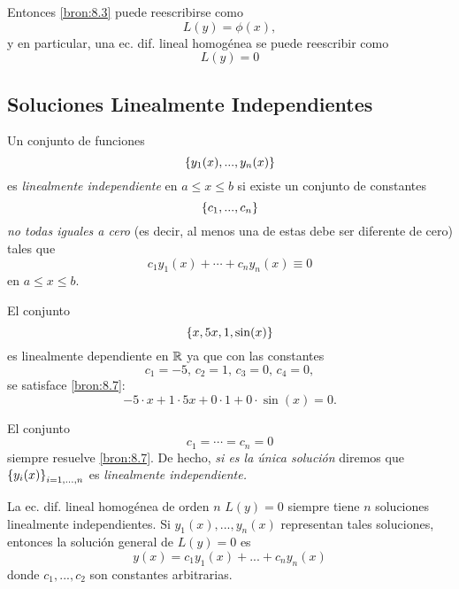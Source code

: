 	Entonces \eqref{bron:8.3} puede reescribirse como
	\begin{equation}
		\label{bron:8.5}
		L(y)=\phi(x),
	\end{equation}
	y en particular, una ec. dif. lineal homog\'enea se puede reescribir como
	\begin{equation}
		\label{bron:8.6}
		L(y)=0
	\end{equation}
	


\subsection{Soluciones Linealmente Independientes}


	Un conjunto de funciones
	$$
	\left\{ y_{1}(x),...,y_{n}(x) \right\}
	$$
	es \emph{linealmente independiente} en $a\leq x \leq b$ si existe un conjunto de constantes
	$$
	\left\{ c_{1}, ..., c_{n} \right\}
	$$ \emph{no todas iguales a cero} (es decir, al menos una de estas debe ser diferente de cero) tales que
	\begin{equation}
		\label{bron:8.7}
		c_{1}y_{1}(x)+\cdots+c_{n}y_{n}(x)\equiv 0
	\end{equation}
	en $a\leq x \leq b.$



	\begin{problema}
		El conjunto
		$$
		\left\{ x, 5x, 1, \sin(x) \right\}
		$$es linealmente dependiente en $\mathbb{R}$ ya que con las constantes
		$$c_{1}=-5, \, c_{2}=1, \, c_{3}=0, \, c_{4}=0,$$ se satisface \eqref{bron:8.7}:
		$$
		-5\cdot x+1\cdot 5x+0\cdot 1+0\cdot \sin(x)=0.
		$$
	\end{problema}
	



	\begin{rem}
		El conjunto $$c_{1}=\cdots =c_{n}=0$$ siempre resuelve \eqref{bron:8.7}. De hecho, \emph{si es la única soluci\'on}  diremos que $\left\{ y_{i}(x) \right\}_{i=1,...,n}$ es \emph{linealmente independiente.}
	\end{rem}
	



	La ec. dif. lineal homog\'enea de orden $n$ $L(y)=0$ siempre tiene $n$ soluciones linealmente independientes. Si $y_{1}(x),...,y_{n}(x)$ representan tales soluciones, entonces la soluci\'on general de $L(y)=0$ es
	\begin{equation}
		\label{bron:8.8}
		y(x)=c_{1}y_{1}(x)+...+c_{n}y_{n}(x)
	\end{equation}
	donde $c_{1},...,c_{2}$ son constantes arbitrarias.


